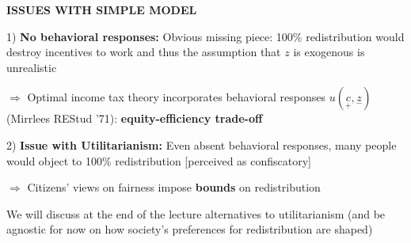 \documentclass[landscape]{slides}
\begin{document}
\begin{slide}
\begin{center}
{\bf ISSUES WITH SIMPLE MODEL}
\end{center}

1) {\bf No behavioral responses:} Obvious missing piece: 100\%
redistribution would destroy incentives to work and thus the
assumption that $z$ is exogenous is unrealistic

$\Rightarrow$ Optimal income tax theory incorporates behavioral
responses $u(\underset{+}{c},\underset{-}{z})$ (Mirrlees REStud '71):  \textbf{equity-efficiency trade-off}

2) {\bf Issue with Utilitarianism:} Even absent behavioral
responses, many people would object to 100\% redistribution
[perceived as confiscatory]

$\Rightarrow$ Citizens' views on fairness impose {\bf bounds} on
redistribution 

We will discuss at the end of the lecture alternatives to utilitarianism
(and be agnostic for now on how society's preferences for redistribution are shaped)
\end{slide}

\begin{slide}

\end{slide}


%
%
%
%
%


%
%
%
%
%
\end{document}
